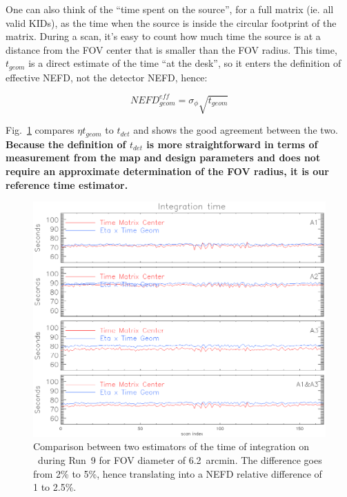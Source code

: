 One can also think of the ``time spent on the source'', for a full matrix
(ie. all valid KIDs), as the time when the source is inside the circular
footprint of the matrix. During a scan, it's easy to count how much time the
source is at a distance from the FOV center that is smaller than the FOV
radius. This time, $t_{geom}$ is a direct estimate of the time ``at the desk'',
so it enters the definition of effective NEFD, not the detector NEFD, hence:

\begin{equation}
NEFD^{eff}_{geom} = \sigma_\phi \sqrt{t_{geom}}
\end{equation}

Fig.~\ref{fig:time_comparison} compares $\eta t_{geom}$ to $t_{det}$ and shows
the good agreement between the two. {\bf Because the definition of $t_{det}$ is more
straightforward in terms of measurement from the map and design parameters and
does not require an approximate determination of the FOV radius, it is our
reference time estimator.}

\begin{figure}
\begin{center}
\includegraphics[clip, angle=0, scale =0.8]{Figures/time_of_integration_0.eps}
\caption[Time of integration]{Comparison between two estimators of the time of
  integration on \hls\ during Run~9 for FOV diameter of 6.2~arcmin. The
  difference goes from 2\% to 5\%, hence translating into a NEFD relative difference of 1
to 2.5\%.}
\label{fig:time_comparison}
\end{center}
\end{figure}

